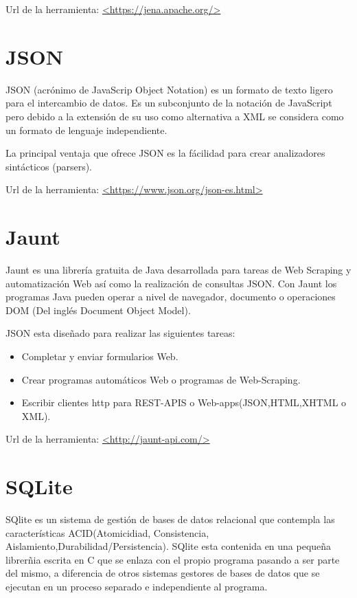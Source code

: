 Url de la herramienta: \url{<https://jena.apache.org/>}

\newpage
\section{JSON}

JSON (acrónimo de JavaScrip Object Notation) es un formato de texto ligero para el intercambio de datos. Es un subconjunto de la notación de JavaScript pero debido a la extensión de su uso como alternativa a XML se considera como un formato de lenguaje independiente.

La principal ventaja que ofrece JSON es la fácilidad para crear analizadores sintácticos (parsers). \cite{wiki:JSON}

Url de la herramienta: \url{<https://www.json.org/json-es.html>}

\section{Jaunt}

Jaunt es una librería gratuita de Java desarrollada para tareas de Web Scraping y automatización Web así como la realización de consultas JSON. Con Jaunt los programas Java pueden operar a nivel de navegador, documento o operaciones DOM (Del inglés Document Object Model).

JSON esta diseñado para realizar las siguientes tareas:
\begin{itemize}
	\item{Completar y enviar formularios Web.}
	\item{Crear programas automáticos Web o programas de Web-Scraping.}
	\item{Escribir clientes http para REST-APIS o Web-apps(JSON,HTML,XHTML o XML).}
\end{itemize}

Url de la herramienta: \url{<http://jaunt-api.com/>}
\section{SQLite}

SQlite es un sistema de gestión de bases de datos relacional que contempla las características ACID(Atomicidiad, Consistencia, Aislamiento,Durabilidad/Persistencia). SQlite esta contenida en una pequeña librerñia escrita en C que se enlaza con el propio programa pasando a ser parte del mismo, a diferencia de otros sistemas gestores de bases de datos que se ejecutan en un proceso separado e independiente al programa.

